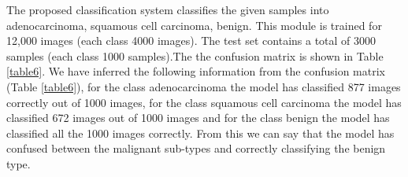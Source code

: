 \documentclass[conference]{IEEEtran}
\begin{document}

The proposed classification system classifies the given samples into adenocarcinoma, squamous cell carcinoma, benign. This module is trained for 12,000 images (each class 4000 images). The test set contains a total of 3000 samples (each class 1000 samples).The the confusion matrix is shown in Table \ref{table6}. We have inferred the following information from the confusion matrix
(Table \ref{table6}), for the class adenocarcinoma the model has classified 877 images correctly out of 1000 images, for the class squamous cell carcinoma the model has classified 672 images out of 1000 images and for the class benign the model has classified all the 1000 images correctly. From this we can say that the model has confused between the malignant sub-types and correctly classifying the benign type.
\end{document}
